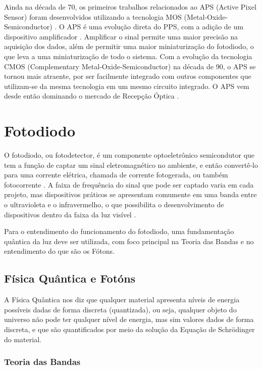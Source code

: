 Ainda na d\'ecada de 70, os primeiros trabalhos relacionados ao APS (Active Pixel Sensor) foram desenvolvidos utilizando a tecnologia MOS (Metal-Oxide-Semiconductor) \cite{Peter}. O APS \'e uma evolução direta do PPS, com a adição de um dispositivo amplificador \cite{EstevaoCoelho}. Amplificar o sinal permite uma maior precisão na aquisição dos dados, al\'em de permitir uma maior miniaturização do fotodiodo, o que leva a uma miniaturização de todo o sistema. Com a evolução da tecnologia CMOS (Complementary Metal-Oxide-Semiconductor) na d\'ecada de 90, o APS se tornou mais atraente, por ser facilmente integrado com outros componentes que utilizam-se da mesma tecnologia em um mesmo circuito integrado. O APS vem desde então dominando o mercado de Recepção Óptica \cite{Andre, LidianeCampos}.


\section{Fotodiodo}

O fotodiodo, ou fotodetector, \'e um componente optoeletrônico semicondutor que tem a função de captar um sinal eletromagn\'etico no ambiente, e então convertê-lo para uma corrente el\'etrica, chamada de corrente fotogerada, ou tamb\'em fotocorrente \cite{RazaviOpt}. A faixa de frequência do sinal que pode ser captado varia em cada projeto, mas dispositivos práticos se apresentam comumente em uma banda entre o ultravioleta e o infravermelho, o que possibilita o desenvolvimento de dispositivos dentro da faixa da luz visível \cite{LidianeCampos}.

Para o entendimento do funcionamento do fotodiodo, uma fundamentação quântica da luz deve ser utilizada, com foco principal na Teoria das Bandas e no entendimento do que são os Fótons.

\subsection{Física Quântica e Fotóns}
A Física Quântica nos diz que qualquer material apresenta níveis de energia possíveis dadas de forma discreta (quantizada), ou seja, qualquer objeto do universo não pode ter qualquer nível de energia, mas sim valores dados de forma discreta, e que são quantificados por meio da solução da Equação de Schrödinger do material. \cite{Sze, JohnSingleton}

\subsubsection{Teoria das Bandas}

